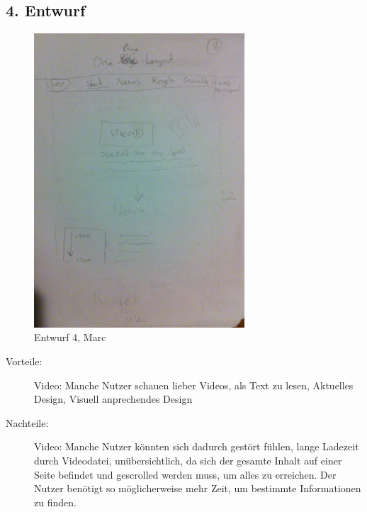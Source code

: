\documentclass{scrartcl}
\begin{document}
 \subsection*{4. Entwurf}
   \begin{figure}[H]
 \centering
   \includegraphics[width=0.7\textwidth]{Version4.jpg}
\caption{Entwurf 4, Marc}
\end{figure}

 \begin{description}
 \item[Vorteile:] Video: Manche Nutzer schauen lieber Videos, als Text zu lesen, Aktuelles Design, Visuell anprechendes Design
 \item[Nachteile:] Video: Manche Nutzer könnten sich dadurch gestört fühlen, lange Ladezeit durch Videodatei, unübersichtlich, da sich der gesamte Inhalt auf einer Seite befindet und gescrolled werden muss, um alles zu erreichen. Der Nutzer benötigt so möglicherweise mehr Zeit, um bestimmte Informationen zu finden. 
 \end{description}

 
\end{document}
